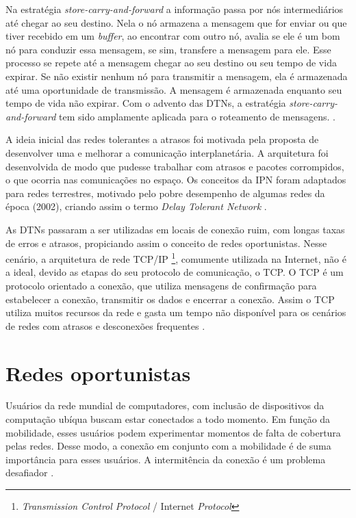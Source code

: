 \documentclass[mestrado, pre-defesa, english, brazil]{packages/icmc}
\begin{document}
Na estratégia \textit{store-carry-and-forward} a informação passa por nós intermediários até chegar ao seu destino. Nela o nó armazena a mensagem que for enviar ou que tiver recebido em um \textit{buffer}, ao encontrar com outro nó, avalia se ele é um bom nó para conduzir essa mensagem, se sim, transfere a mensagem para ele. Esse processo se repete até a mensagem chegar ao seu destino ou seu tempo de vida expirar. Se não existir nenhum nó para transmitir a mensagem, ela é armazenada até uma oportunidade de transmissão. A mensagem é armazenada enquanto seu tempo de vida não expirar. Com o advento das DTNs, a estratégia \textit{store-carry-and-forward} tem sido amplamente aplicada para o roteamento de mensagens. \cite{Bulut-2010}.

A ideia inicial das redes tolerantes a atrasos foi motivada pela proposta de desenvolver uma  e melhorar a comunicação interplanetária. A arquitetura foi desenvolvida de modo que pudesse trabalhar com atrasos e pacotes corrompidos, o que ocorria nas comunicações no espaço. Os conceitos da IPN foram adaptados para redes terrestres, motivado pelo pobre desempenho de algumas redes da época (2002), criando assim o termo \textit{Delay Tolerant Network} \cite{Fall-2003,Pond-2013}.

As DTNs passaram a ser utilizadas em locais de conexão ruim, com longas taxas de erros e atrasos, propiciando assim o conceito de redes oportunistas. Nesse cenário, a arquitetura de rede TCP/IP \footnote{\textit{Transmission Control Protocol} / Internet \textit{Protocol}}, comumente utilizada na Internet, não é a ideal, devido as etapas do seu protocolo de comunicação, o TCP. O TCP é um protocolo orientado a conexão, que utiliza mensagens de confirmação para estabelecer a conexão, transmitir os dados e encerrar a conexão. Assim o TCP utiliza muitos recursos da rede e gasta um tempo não disponível para os cenários de redes com atrasos e desconexões frequentes \cite{Tanenbaum-2011,Pond-2013,Fall-2003}.

\section{Redes oportunistas} \label{opotunismo}

Usuários da rede mundial de computadores, com inclusão de dispositivos da computação ubíqua buscam estar conectados a todo momento. Em função da mobilidade, esses usuários podem experimentar momentos de falta de cobertura pelas redes. Desse modo, a conexão em conjunto com a mobilidade é de suma importância para esses usuários. A intermitência da conexão é um problema desafiador \cite{Sastry-2009,Sastry-2011,Hui-2005}.
\end{document}
